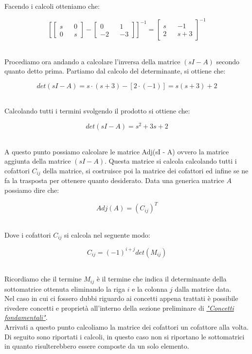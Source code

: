\documentclass[../main.tex]{subfiles}
\begin{document}
Facendo i calcoli otteniamo che:

\[ \left[ \begin{bmatrix} s && 0 \\ 0 && s \end{bmatrix} - \begin{bmatrix} 0 && 1 \\ -2 && -3 \end{bmatrix} \right] ^{-1}  =  \begin{bmatrix} s && -1 \\ 2 && s+3 \end{bmatrix}^{-1} \]\

Procediamo ora andando a calcolare l'inversa della matrice $(sI - A)$ secondo quanto detto prima. Partiamo dal calcolo del determinante, si ottiene che:

\[ \unit{det}(sI - A) = s \cdot (s+3) - [2 \cdot (-1)] = s(s+3) + 2 \]\

Calcolando tutti i termini svolgendo il prodotto si ottiene che:


\[ \unit{det}(sI - A) = s^2 +3s + 2 \]\

A questo punto possiamo calcolare le matrice \unit{Adj}(sI - A) ovvero la matrice aggiunta della matrice $(sI - A)$. Questa matrice si calcola calcolando tutti i cofattori $C_{ij}$ della matrice, si costruisce poi la matrice dei cofattori ed infine se ne fa la trasposta per ottenere quanto desiderato.
Data una generica matrice $A$ possiamo dire che:

\[\unit{Adj}(A) = (C_{ij})^T\]\

Dove i cofattori $C_{ij}$ si calcola nel seguente modo:

\[ C_{ij} = (-1)^{i+j} \unit{det}(M_{ij}) \]\

Ricordiamo che il termine $M_{ij}$ è il termine che indica il determinante della sottomatrice ottenuta eliminando la riga $i$ e la colonna $j$ dalla matrice data.\\

Nel caso in cui ci fossero dubbi riguardo ai concetti appena trattati è possibile rivedere concetti e proprietà all'interno della sezione preliminare di \hyperref[sec:concetti]{\textit{"Concetti fondamentali"}}.\\


Arrivati a questo punto calcoliamo la matrice dei cofattori un cofattore alla volta.
Di seguito sono riportati i calcoli, in questo caso non si riportano le sottomatrici in quanto risulterebbero essere composte da un solo elemento.
\end{document}
